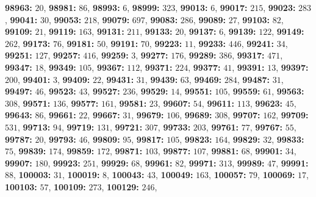 \textsf{\bfseries 98963:} $20$, \textsf{\bfseries 98981:} $86$, \textsf{\bfseries 98993:} $6$, \textsf{\bfseries 98999:} $323$, \textsf{\bfseries 99013:} $6$, \textsf{\bfseries 99017:} $215$, \textsf{\bfseries 99023:} $283$, \textsf{\bfseries 99041:} $30$, \textsf{\bfseries 99053:} $218$, \textsf{\bfseries 99079:} $697$, \textsf{\bfseries 99083:} $286$, \textsf{\bfseries 99089:} $27$, \textsf{\bfseries 99103:} $82$, \textsf{\bfseries 99109:} $21$, \textsf{\bfseries 99119:} $163$, \textsf{\bfseries 99131:} $211$, \textsf{\bfseries 99133:} $20$, \textsf{\bfseries 99137:} $6$, \textsf{\bfseries 99139:} $122$, \textsf{\bfseries 99149:} $262$, \textsf{\bfseries 99173:} $76$, \textsf{\bfseries 99181:} $50$, \textsf{\bfseries 99191:} $70$, \textsf{\bfseries 99223:} $11$, \textsf{\bfseries 99233:} $446$, \textsf{\bfseries 99241:} $34$, \textsf{\bfseries 99251:} $127$, \textsf{\bfseries 99257:} $416$, \textsf{\bfseries 99259:} $3$, \textsf{\bfseries 99277:} $176$, \textsf{\bfseries 99289:} $386$, \textsf{\bfseries 99317:} $471$, \textsf{\bfseries 99347:} $18$, \textsf{\bfseries 99349:} $105$, \textsf{\bfseries 99367:} $112$, \textsf{\bfseries 99371:} $224$, \textsf{\bfseries 99377:} $41$, \textsf{\bfseries 99391:} $13$, \textsf{\bfseries 99397:} $200$, \textsf{\bfseries 99401:} $3$, \textsf{\bfseries 99409:} $22$, \textsf{\bfseries 99431:} $31$, \textsf{\bfseries 99439:} $63$, \textsf{\bfseries 99469:} $284$, \textsf{\bfseries 99487:} $31$, \textsf{\bfseries 99497:} $46$, \textsf{\bfseries 99523:} $43$, \textsf{\bfseries 99527:} $236$, \textsf{\bfseries 99529:} $14$, \textsf{\bfseries 99551:} $105$, \textsf{\bfseries 99559:} $61$, \textsf{\bfseries 99563:} $308$, \textsf{\bfseries 99571:} $136$, \textsf{\bfseries 99577:} $161$, \textsf{\bfseries 99581:} $23$, \textsf{\bfseries 99607:} $54$, \textsf{\bfseries 99611:} $113$, \textsf{\bfseries 99623:} $45$, \textsf{\bfseries 99643:} $86$, \textsf{\bfseries 99661:} $22$, \textsf{\bfseries 99667:} $31$, \textsf{\bfseries 99679:} $106$, \textsf{\bfseries 99689:} $308$, \textsf{\bfseries 99707:} $162$, \textsf{\bfseries 99709:} $531$, \textsf{\bfseries 99713:} $94$, \textsf{\bfseries 99719:} $131$, \textsf{\bfseries 99721:} $307$, \textsf{\bfseries 99733:} $203$, \textsf{\bfseries 99761:} $77$, \textsf{\bfseries 99767:} $55$, \textsf{\bfseries 99787:} $20$, \textsf{\bfseries 99793:} $46$, \textsf{\bfseries 99809:} $95$, \textsf{\bfseries 99817:} $105$, \textsf{\bfseries 99823:} $164$, \textsf{\bfseries 99829:} $32$, \textsf{\bfseries 99833:} $75$, \textsf{\bfseries 99839:} $174$, \textsf{\bfseries 99859:} $172$, \textsf{\bfseries 99871:} $103$, \textsf{\bfseries 99877:} $107$, \textsf{\bfseries 99881:} $68$, \textsf{\bfseries 99901:} $34$, \textsf{\bfseries 99907:} $180$, \textsf{\bfseries 99923:} $251$, \textsf{\bfseries 99929:} $68$, \textsf{\bfseries 99961:} $82$, \textsf{\bfseries 99971:} $313$, \textsf{\bfseries 99989:} $47$, \textsf{\bfseries 99991:} $88$, \textsf{\bfseries 100003:} $31$, \textsf{\bfseries 100019:} $8$, \textsf{\bfseries 100043:} $43$, \textsf{\bfseries 100049:} $163$, \textsf{\bfseries 100057:} $79$, \textsf{\bfseries 100069:} $17$, \textsf{\bfseries 100103:} $57$, \textsf{\bfseries 100109:} $273$, \textsf{\bfseries 100129:} $246$, 
